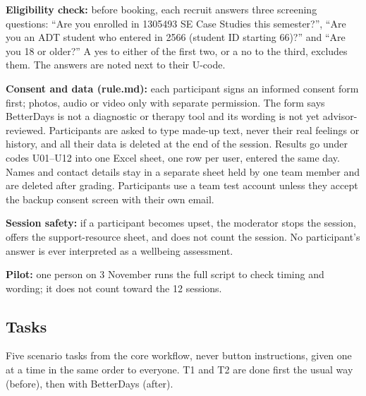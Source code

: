 \documentclass{article}
\begin{document}
\textbf{Eligibility check:} before booking, each recruit answers three screening questions: ``Are you enrolled in 1305493 SE Case Studies this semester?'', ``Are you an ADT student who entered in 2566 (student ID starting 66)?'' and ``Are you 18 or older?'' A yes to either of the first two, or a no to the third, excludes them. The answers are noted next to their U-code.

\textbf{Consent and data (rule.md):} each participant signs an informed consent form first; photos, audio or video only with separate permission. The form says BetterDays is not a diagnostic or therapy tool and its wording is not yet advisor-reviewed. Participants are asked to type made-up text, never their real feelings or history, and all their data is deleted at the end of the session. Results go under codes U01--U12 into one Excel sheet, one row per user, entered the same day. Names and contact details stay in a separate sheet held by one team member and are deleted after grading. Participants use a team test account unless they accept the backup consent screen with their own email.

\textbf{Session safety:} if a participant becomes upset, the moderator stops the session, offers the support-resource sheet, and does not count the session. No participant's answer is ever interpreted as a wellbeing assessment.

\textbf{Pilot:} one person on 3 November runs the full script to check timing and wording; it does not count toward the 12 sessions.

\subsection{Tasks}

Five scenario tasks from the core workflow, never button instructions, given one at a time in the same order to everyone. T1 and T2 are done first the usual way (before), then with BetterDays (after).
\end{document}
